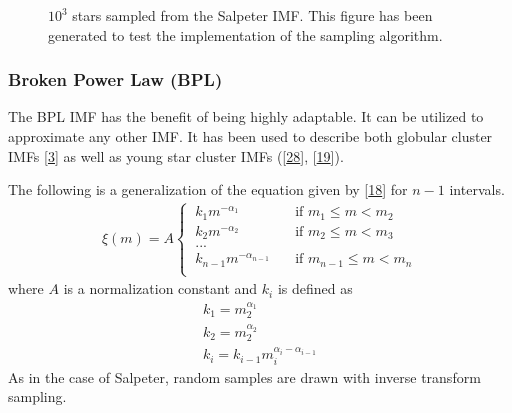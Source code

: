 \documentclass[letterpaper,10pt,english]{sphinxmanual}
\begin{document}
				\begin{figure}[htbp]
				\centering
				\capstart
				
				\noindent{}
				\caption{\(10^3\) stars sampled from the Salpeter IMF. This figure has been generated to test the implementation of the sampling algorithm.}\label{\detokenize{NBodySimulation/Initialization:id41}}\label{\detokenize{NBodySimulation/Initialization:fig-initial-conditions-mass-salpeter}}\end{figure}
		
		
			\subsubsection{Broken Power Law (BPL)}
				\label{\detokenize{NBodySimulation/Initialization:broken-power-law-bpl}}
				\sphinxAtStartPar
				The BPL IMF has the benefit of being highly adaptable. It can be utilized to approximate any other IMF.
				It has been used to describe both globular cluster IMFs {[}\hyperlink{cite.NBodySimulation/Appendix:id11}{3}{]} as well as young star cluster IMFs ({[}\hyperlink{cite.NBodySimulation/Appendix:id12}{28}{]}, {[}\hyperlink{cite.NBodySimulation/Appendix:id13}{19}{]}).
				
				\sphinxAtStartPar
				The following is a generalization of the equation given by {[}\hyperlink{cite.NBodySimulation/Appendix:id10}{18}{]} for \(n-1\) intervals.
				\begin{equation*}
				\begin{split}\xi(m)=A
				\begin{cases}
				    \ k_{1}m^{-\alpha_{1}} &\quad\text{if }m_{1}\leqslant m< m_{2}\\
				    \ k_{2}m^{-\alpha_{2}} &\quad\text{if }m_{2}\leqslant m< m_{3}\\
				    \ ...  \\
				    \ k_{n-1}m^{-\alpha_{n-1}} &\quad\text{if }m_{n-1}\leqslant m< m_{n}\\
				\end{cases}\end{split}
				\end{equation*}
				\sphinxAtStartPar
				where \(A\) is a normalization constant and \(k_{i}\) is defined as
				\begin{equation*}
				\begin{split}k_{1} = m_{2}^{\alpha_{1}} \\
				k_{2} = m_{2}^{\alpha_{2}} \\
				k_{i} = k_{i-1}m_{i}^{\alpha_{i}-\alpha_{i-1}}\end{split}
				\end{equation*}
				\sphinxAtStartPar
				As in the case of Salpeter, random samples are drawn with inverse transform sampling.
				
\end{document}
